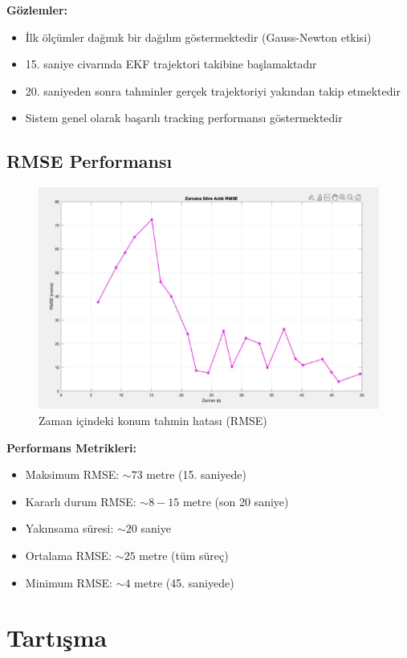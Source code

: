 \documentclass[11pt,a4paper]{article}
\begin{document}
\textbf{Gözlemler:}
\begin{itemize}
    \item İlk ölçümler dağınık bir dağılım göstermektedir (Gauss-Newton etkisi)
    \item 15. saniye civarında EKF trajektori takibine başlamaktadır
    \item 20. saniyeden sonra tahminler gerçek trajektoriyi yakından takip etmektedir
    \item Sistem genel olarak başarılı tracking performansı göstermektedir
\end{itemize}

\subsection{RMSE Performansı}
\begin{figure}[H]
    \centering
    \includegraphics[width=12cm]{rmse_small.png}
    \caption{Zaman içindeki konum tahmin hatası (RMSE)}
    \label{fig:rmse}
\end{figure}

\textbf{Performans Metrikleri:}
\begin{itemize}
    \item Maksimum RMSE: $\sim 73$ metre (15. saniyede)
    \item Kararlı durum RMSE: $\sim 8-15$ metre (son 20 saniye)
    \item Yakınsama süresi: $\sim 20$ saniye
    \item Ortalama RMSE: $\sim 25$ metre (tüm süreç)
    \item Minimum RMSE: $\sim 4$ metre (45. saniyede)
\end{itemize}

\section{Tartışma}
\end{document}
